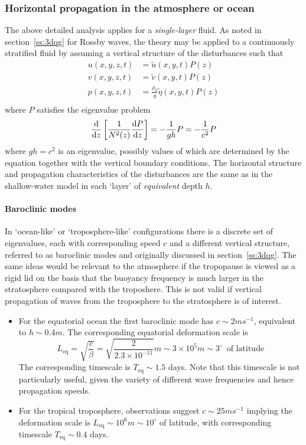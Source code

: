 \documentclass{jknotes}
\begin{document}
\subsubsection{Horizontal propagation in the atmosphere or ocean}
The above detailed analysis applies for a \emph{single-layer} fluid. As noted
in section~\ref{ss:3dqg} for Rossby waves, the theory may be applied to a
continuously stratified fluid by assuming a vertical structure of the
disturbances such that
\begin{align}
	u(x,y,z,t) &= \tilde{u}(x,y,t)P(z)\\
	v(x,y,z,t) &= \tilde{v}(x,y,t)P(z)\\
	p(x,y,z,t) &= \frac{\rho_0}{g}\tilde{\eta}(x,y,t)P(z)\\
\end{align}
where $P$ satisfies the eigenvalue problem
\begin{equation}
	\frac{\diffd}{\diffd z}\left[ \frac{1}{N^2(z)} \frac{\diffd P}{\diffd
	z}\right] = -\frac{1}{gh} P = -\frac{1}{c^2} P
\end{equation}
where $gh = c^2$ is an eigenvalue, possibly values of which are determined by
the equation together with the vertical boundary conditions. The horizontal
structure and propagation characteristics of the disturbances are the same as
in the shallow-water model in each `layer' of \emph{equivalent} depth $h$.

\paragraph{Baroclinic modes}
In `ocean-like' or `troposphere-like' configurations there is a discrete set
of eigenvalues, each with corresponding speed $c$ and a different vertical
structure, referred to as baroclinic modes and originally discussed in
section~\ref{ss:3dqg}. The same ideas would be relevant to the atmosphere if
the tropopause is viewed as a rigid lid on the basis that the buoyancy
frequency is much larger in the stratosphere compared with the troposhere.
This is not valid if vertical propagation of waves from the troposphere to the
stratosphere is of interest.

\begin{itemize}
	\item For the equatorial ocean the first baroclinic mode has $c \sim 2 m
		s^{-1}$, equivalent to $h \sim 0.4 m$. The corresponding equatorial
		deformation scale is
		\begin{equation}
			L_{\text{eq}} = \sqrt{\frac{c}{\beta}} = \sqrt{\frac{2}{2.3 \times
				10^{-11}}} m \sim 3 \times 10^5 m \sim 3^{\circ} \,\,\,\text{of
			latitude}
		\end{equation}
		The corresponding timescale is $T_{\text{eq}} \sim 1.5$ days. Note
		that this timescale is not particularly useful, given the variety of
		different wave frequencies and hence propagation speeds.
	\item For the tropical troposphere, observations suggest $c \sim 25 m
		s^{-1}$ implying the deformation scale is $L_{\text{eq}} \sim 10^6 m
		\sim 10^{\circ}$ of latitude, with corresponding timescale
		$T_{\text{eq}} \sim 0.4$ days. 
\end{itemize}
\end{document}
